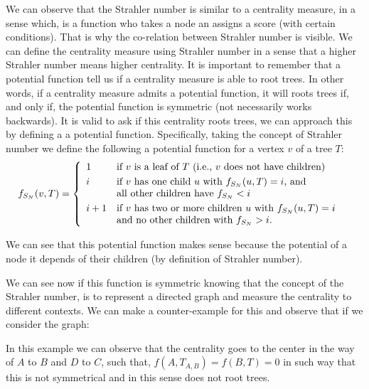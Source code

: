 
We can observe that the Strahler number is similar to a centrality measure, in a sense which, is a function who takes a node an assigns a score (with certain conditions). That is why the co-relation between Strahler number is visible. We can define the centrality measure using Strahler number in a sense that a higher Strahler number means higher centrality. It is important to remember that a potential function tell us if a centrality measure is able to root trees. In other words, if a centrality measure admits a potential function, it will roots trees if, and only if, the potential function is symmetric (not necessarily works backwards). It is valid to ask if this centrality roots trees, we can approach this by defining a a potential function. Specifically, taking the concept of Strahler number we define the following a potential function for a vertex $v$ of a tree $T$:
    \begin{equation*}
        f_{S_{N}} (v,T) = \left\{ \begin{array}{llc}
             1 &   \text{if $v$ is a leaf of $T$ (i.e., $v$ does not have children)}  & \smallskip \\ 
              i & \text{if $v$ has one child $u$ with $f_{S_{N}}(u, T) = i$, and} \\
              	& \text{all other children have  $f_{S_{N}} < i$} \smallskip \\
              i + 1 &  \text{if $v$ has two or more children $u$ with $f_{S_{N}}(u, T) = i$} \\
              & \text{and no other children with $f_{S_{N}} > i$.} \\
             \end{array}
   \right.
    \end{equation*}
    
We can see that this potential function makes sense because the potential of a node it depends of their children (by definition of Strahler number).

We can see now if this function is symmetric knowing that the concept of the Strahler number, is to represent a directed graph and measure the centrality to different contexts. We can make a counter-example for this and observe that if we consider the graph:
\begin{center}
\end{center}
In this example we can observe that the centrality goes to the center in the way of $A$ to $B$ and $D$ to $C$, such that, $f(A,T_{A,B}) =  f(B,T) = 0$ in such way that this is not symmetrical and in this sense does not root trees.

